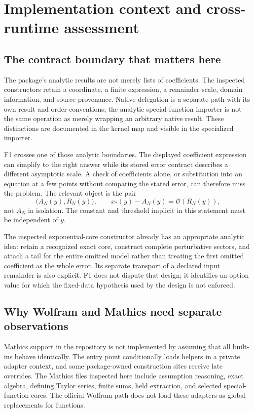 \documentclass[11pt,letterpaper]{article}
\newcommand{\code}[1]{\texttt{\detokenize{#1}}}
\newcommand{\OO}{\mathcal O}
\begin{document}
\section{Implementation context and cross-runtime assessment}
\subsection{The contract boundary that matters here}
The package's analytic results are not merely lists of coefficients. The inspected constructors retain a coordinate, a finite expression, a remainder scale, domain information, and source provenance. Native delegation is a separate path with its own result and order conventions; the analytic special-function importer is not the same operation as merely wrapping an arbitrary native result. These distinctions are documented in the kernel map and visible in the specialized importer.\cite{kernel-map,native-import}

F1 crosses one of those analytic boundaries. The displayed coefficient expression can simplify to the right answer while its stored error contract describes a different asymptotic scale. A check of coefficients alone, or substitution into an equation at a few points without comparing the stated error, can therefore miss the problem. The relevant object is the pair
\[
\bigl(A_N(y),R_N(y)\bigr),\qquad x_*(y)-A_N(y)=\OO(R_N(y)),
\]
not $A_N$ in isolation. The constant and threshold implicit in this statement must be independent of $y$.

The inspected exponential-core constructor already has an appropriate analytic idea: retain a recognized exact core, construct complete perturbative sectors, and attach a tail for the entire omitted model rather than treating the first omitted coefficient as the whole error. Its separate transport of a declared input remainder is also explicit. F1 does not dispute that design; it identifies an option value for which the fixed-data hypothesis used by the design is not enforced.\cite{exp-core}

\subsection{Why Wolfram and Mathics need separate observations}
Mathics support in the repository is not implemented by assuming that all built-ins behave identically. The entry point conditionally loads helpers in a private adapter context, and some package-owned construction sites receive late overrides. The Mathics files inspected here include assumption reasoning, exact algebra, defining Taylor series, finite sums, held extraction, and selected special-function cores. The official Wolfram path does not load these adapters as global replacements for \code{System} functions.\cite{kernel-map,mathics-assumptions,mathics-core,mathics-taylor}
\end{document}
